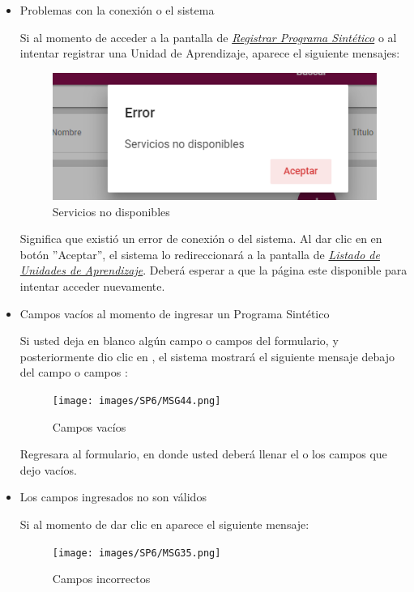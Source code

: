\documentclass[10pt]{book}
\begin{document}
    \begin{itemize}
        \item Problemas con la conexión o el sistema

        Si al momento de acceder a la pantalla de \hyperlink{registrarPS}{\textit{Registrar Programa Sintético}} o al intentar registrar una Unidad de Aprendizaje, aparece el siguiente mensajes:

        \begin{figure}[!hbtp]
            \centering
            \includegraphics[width=0.4\linewidth]{images/SP6/MSGSN.png}
            \caption{Servicios no disponibles}
            \label{SND}

        \end{figure}
        
        Significa que existió un error de conexión o del sistema. Al dar clic en en botón ''Aceptar'', el sistema lo redireccionará a la pantalla de \hyperlink{verTareas}{\textit{Listado de Unidades de Aprendizaje}}. Deberá esperar a que la página este disponible para  intentar acceder nuevamente.

        \item Campos vacíos al momento de ingresar un Programa Sintético

        Si usted deja en blanco algún campo o campos del formulario, y posteriormente dio clic en , el sistema mostrará el siguiente mensaje debajo del campo o campos :
                
        \begin{figure}[!hbtp]
            \centering
            \texttt{[image: images/SP6/MSG44.png]}
            \caption{Campos vacíos}
            \label{mensaje44}
       \end{figure}

       Regresara al formulario, en donde usted deberá llenar el o los campos que dejo vacíos.

       \item Los campos ingresados no son válidos

       Si al momento de dar clic en  aparece el siguiente mensaje:
        \begin{figure}[!hbtp]
            \centering
            \texttt{[image: images/SP6/MSG35.png]}
            \caption{Campos incorrectos}
            \label{mensaje35}
        \end{figure}


\end{itemize}
\end{document}
